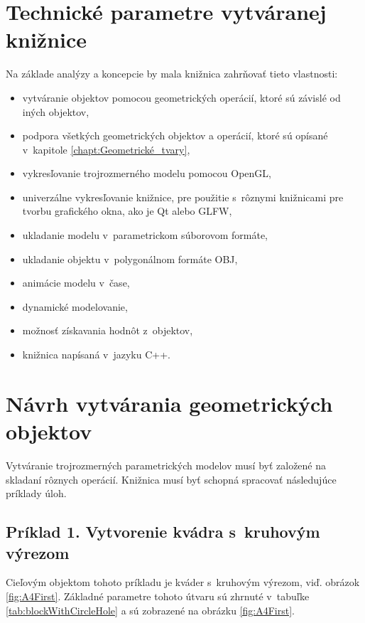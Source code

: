 \section{Technické parametre vytváranej knižnice}
Na základe analýzy a koncepcie  by mala knižnica zahrňovať tieto vlastnosti:
\begin{itemize}
\item vytváranie objektov pomocou geometrických operácií, ktoré sú závislé od iných objektov,
\item podpora všetkých geometrických objektov a operácií, ktoré sú opísané v~kapitole \ref{chapt:Geometrické_tvary},
\item vykresľovanie trojrozmerného modelu pomocou OpenGL,
\item univerzálne vykresľovanie knižnice, pre použitie s~rôznymi knižnicami pre tvorbu grafického okna, ako je Qt alebo GLFW,
\item ukladanie modelu v~parametrickom súborovom formáte,
\item ukladanie objektu v~polygonálnom formáte  OBJ,
\item animácie modelu v~čase,
\item dynamické modelovanie,
\item možnosť získavania hodnôt z~objektov,
\item knižnica napísaná v~jazyku C++.
\end{itemize}


\section{Návrh vytvárania geometrických objektov} \label{sec:navrhOperacii}
Vytváranie trojrozmerných parametrických modelov musí byť založené na skladaní rôznych operácií. 
Knižnica musí byť schopná spracovať následujúce príklady úloh.

\subsection*{Príklad 1. Vytvorenie kvádra s~kruhovým výrezom}
Cieľovým objektom tohoto príkladu je kváder s~kruhovým výrezom, viď. obrázok \ref{fig:A4First}. Základné parametre tohoto útvaru sú zhrnuté v~tabuľke \ref{tab:blockWithCircleHole}  a sú zobrazené na obrázku \ref{fig:A4First}.

